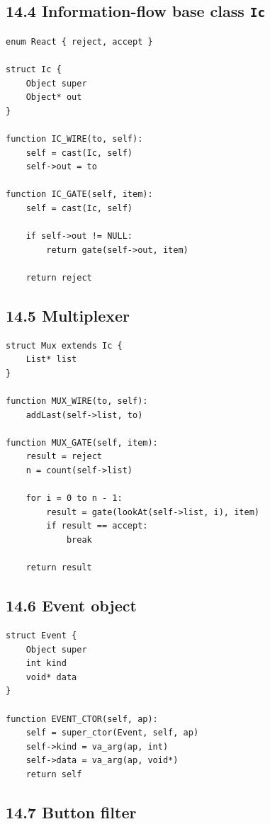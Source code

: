 \documentclass[11pt]{article}
\begin{document}
\subsection{\texorpdfstring{14.4 Information-flow base class
\texttt{Ic}}{14.4 Information-flow base class Ic}}\label{information-flow-base-class-ic}

\begin{verbatim}
enum React { reject, accept }

struct Ic {
    Object super
    Object* out
}

function IC_WIRE(to, self):
    self = cast(Ic, self)
    self->out = to

function IC_GATE(self, item):
    self = cast(Ic, self)

    if self->out != NULL:
        return gate(self->out, item)

    return reject
\end{verbatim}

\subsection{14.5 Multiplexer}\label{multiplexer}

\begin{verbatim}
struct Mux extends Ic {
    List* list
}

function MUX_WIRE(to, self):
    addLast(self->list, to)

function MUX_GATE(self, item):
    result = reject
    n = count(self->list)

    for i = 0 to n - 1:
        result = gate(lookAt(self->list, i), item)
        if result == accept:
            break

    return result
\end{verbatim}

\subsection{14.6 Event object}\label{event-object}

\begin{verbatim}
struct Event {
    Object super
    int kind
    void* data
}

function EVENT_CTOR(self, ap):
    self = super_ctor(Event, self, ap)
    self->kind = va_arg(ap, int)
    self->data = va_arg(ap, void*)
    return self
\end{verbatim}

\subsection{14.7 Button filter}\label{button-filter}
\end{document}
